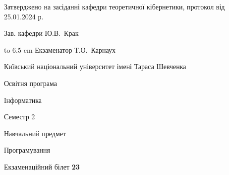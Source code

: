 \documentclass[12pt, ukrainian]{article}
\begin{document}
{\smallskip\smallskip \begin {scriptsize} Затверджено на засіданні кафедри теоретичної кібернетики, протокол   від   25.01.2024 р.\par\smallskip\smallskip\smallskip\smallskip
{\parbox {6.5 cm} {Зав. кафедри \dotfill Ю.В.~Крак}}\hspace {0.7cm} {\hbox to 6.5 cm { Екзаменатор \dotfill Т.О.~Карнаух}} \end{scriptsize}}
\newpage
{{\begin {scriptsize}\par
{ \center  Київський національний університет імені Тараса Шевченка \par}
{\parbox {5 cm}{Освітня програма \hfill}{\parbox {7 cm}{Інформатика\hfill}}\parbox {6 cm}{\hfill Семестр 2}}\par
{\parbox {5 cm} {Навчальний предмет \hfill}\parbox {7 cm}{Програмування \hfill}\parbox {6cm}{\hfill}\par}\vspace{-15pt} \end{scriptsize}}{\center Екзаменаційний білет \No \textbf { 23 }\par}}
\end{document}
